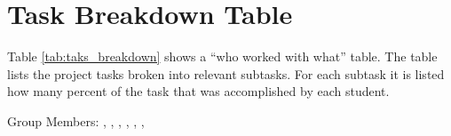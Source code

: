\section{Task Breakdown Table \label{sec:tasks}}

Table \ref{tab:taks_breakdown} shows a “who worked with what” table. The table lists the project tasks broken into relevant subtasks. For each subtask it is listed how many percent of the task that was accomplished by each student.

\newpage 
Group Members: \authorOne, \authorTwo, \authorThree, \authorFour, \authorFive, \authorSix, \authorSeven


